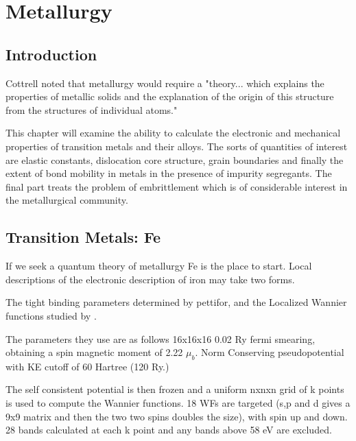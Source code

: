 \chapter{Metallurgy}
\section{Introduction}
  Cottrell noted that metallurgy would require a "theory... which explains
the properties of metallic solids and the explanation of the origin of this
structure from the structures of individual atoms." 

This chapter will examine the ability to calculate the electronic and mechanical
properties of transition metals and their alloys. The sorts of quantities
of interest are elastic constants, dislocation core structure, grain boundaries
and finally the extent of bond mobility in metals in the presence of impurity
segregants. The final part treats the problem of embrittlement which is of considerable
interest in the metallurgical community.


\section{Transition Metals: Fe}
If we seek a quantum theory of metallurgy Fe is the place to start.
Local descriptions of the electronic description of iron may take two forms. 

The tight binding parameters determined by pettifor, and the Localized 
Wannier functions studied by \cite{yates06}. 

The parameters they use are as follows 16x16x16 0.02 Ry fermi smearing, obtaining
a spin magnetic moment of 2.22 $\mu_{b}$. Norm Conserving pseudopotential with KE cutoff
of 60 Hartree (120 Ry.)

The self consistent potential is then frozen and a uniform nxnxn grid of k points is
used to compute the Wannier functions. 18 WFs are targeted (s,p and d gives a 9x9 matrix
and then the two two spins doubles the size), with spin up and 
down. 28 bands calculated at each k point and any bands above 58 eV are excluded.

